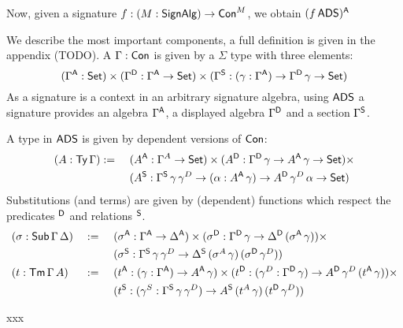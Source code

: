 \documentclass[a4paper,UKenglish,cleveref, autoref]{lipics-v2019}
\begin{document}

Now, given a signature $f:(M:\SignAlg)\ra\Con^M$, we obtain
$(f\,\ADS)^\A$


  We describe the most important
  components, a full definition is given in the appendix (TODO). A
  $\Gamma:\Con$ is given by a $\Sigma$ type with three elements:
  \[
    (\Gamma^\A:\Set) \times (\Gamma^\D:\Gamma^\A\ra\Set) \times (\Gamma^\S:(\gamma:\Gamma^\A)\ra\Gamma^\D\,\gamma\ra\Set)
  \]
  As a signature is a context in an arbitrary signature algebra, using
  $\ADS$ a signature provides an algebra $\Gamma^\A$, a displayed
  algebra $\Gamma^\D$ and a section $\Gamma^\S$.

  A type in $\ADS$ is given by dependent versions of $\Con$:
  \begin{alignat*}{6}
    & (A:\Ty\,\Gamma) := \,\,&& (A^\A:\Gamma^A\ra\Set) \times (A^\D:\Gamma^\D\,\gamma\ra A^\A\,\gamma\ra\Set) \times \\
    & && (A^\S:\Gamma^\S\,\gamma\,\gamma^D\ra(\alpha:A^\A\,\gamma)\ra A^\D\,\gamma^D\,\alpha\ra\Set)
  \end{alignat*}
  Substitutions (and terms) are given by (dependent) functions which
  respect the predicates $^\D$ and relations $^\S$.
  \begin{alignat*}{10}
    & (\sigma:\Sub\,\Gamma\,\Delta) && := \,\, && (\sigma^\A:\Gamma^\A\ra\Delta^\A) \times (\sigma^\D:\Gamma^\D\,\gamma\ra\Delta^\D\,(\sigma^\A\,\gamma)) \times \\
    & && && \rlap{$(\sigma^\S:\Gamma^\S\,\gamma\,\gamma^D\ra\Delta^\S\,(\sigma^A\,\gamma)\,(\sigma^\D\,\gamma^D))$} \\
    & (t:\Tm\,\Gamma\,A) && := && (t^\A:(\gamma:\Gamma^\A)\ra A^\A\,\gamma) \times (t^\D:(\gamma^D:\Gamma^\D\,\gamma)\ra A^\D\,\gamma^D\,(t^\A\,\gamma)) \times \\
    & && && (t^\S:(\gamma^S:\Gamma^\S\,\gamma\,\gamma^D)\ra A^\S\,(t^A\,\gamma)\,(t^\D\,\gamma^D))
  \end{alignat*}

  xxx
\end{document}
